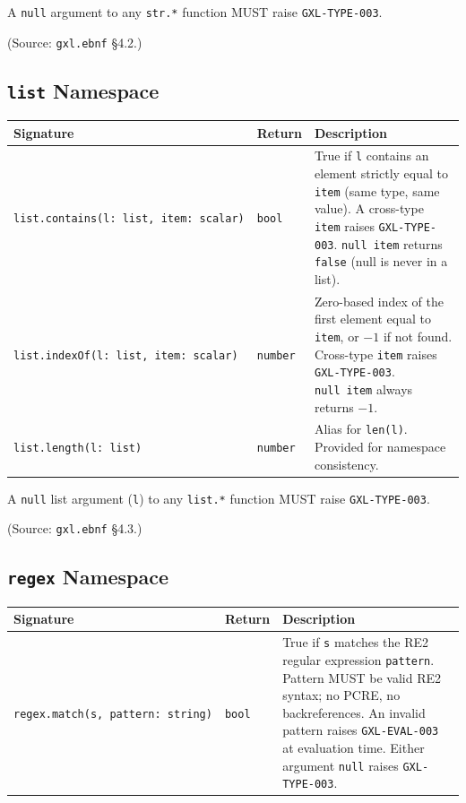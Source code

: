 A \texttt{null} argument to any \texttt{str.*} function MUST raise
\texttt{GXL-TYPE-003}.

(Source: \texttt{gxl.ebnf} \S4.2.)

\subsection{\texttt{list} Namespace}
\label{subsec:gxl:stdlib:list}

\begin{center}
\begin{tabular}{p{5.5cm}p{1.5cm}p{6cm}}
\hline
\textbf{Signature} & \textbf{Return} & \textbf{Description} \\
\hline
\texttt{list.contains(l:\ list,\ item:\ scalar)} & \texttt{bool}
  & True if \texttt{l} contains an element strictly equal to \texttt{item}
    (same type, same value).
    A cross-type \texttt{item} raises \texttt{GXL-TYPE-003}.
    \texttt{null}~\texttt{item} returns \texttt{false}
    (null is never in a list). \\
\texttt{list.indexOf(l:\ list,\ item:\ scalar)} & \texttt{number}
  & Zero-based index of the first element equal to \texttt{item},
    or $-1$ if not found.
    Cross-type \texttt{item} raises \texttt{GXL-TYPE-003}.
    \texttt{null}~\texttt{item} always returns $-1$. \\
\texttt{list.length(l:\ list)} & \texttt{number}
  & Alias for \texttt{len(l)}. Provided for namespace consistency. \\
\hline
\end{tabular}
\end{center}

A \texttt{null} list argument (\texttt{l}) to any \texttt{list.*} function
MUST raise \texttt{GXL-TYPE-003}.

(Source: \texttt{gxl.ebnf} \S4.3.)

\subsection{\texttt{regex} Namespace}
\label{subsec:gxl:stdlib:regex}

\begin{center}
\begin{tabular}{p{5.5cm}p{1.5cm}p{6cm}}
\hline
\textbf{Signature} & \textbf{Return} & \textbf{Description} \\
\hline
\texttt{regex.match(s,\ pattern:\ string)} & \texttt{bool}
  & True if \texttt{s} matches the RE2 regular expression
    \texttt{pattern}.
    Pattern MUST be valid RE2 syntax; no PCRE, no backreferences.
    An invalid pattern raises \texttt{GXL-EVAL-003} at evaluation time.
    Either argument \texttt{null} raises \texttt{GXL-TYPE-003}. \\
\hline
\end{tabular}
\end{center}

